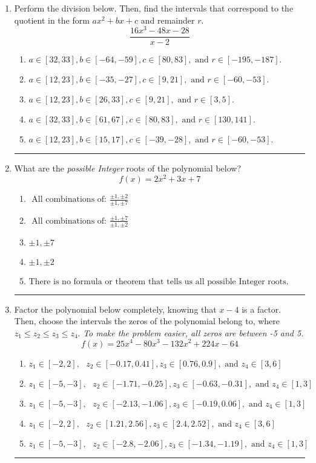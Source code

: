 \documentclass[14pt]{extbook}
\newcommand{\litem}[1]{\item#1\hspace*{-1cm}\rule{\textwidth}{0.4pt}}
\begin{document}
\begin{enumerate}
{\begin{enumerate}[label=\Alph*.]
\end{enumerate} }
\litem{
Perform the division below. Then, find the intervals that correspond to the quotient in the form $ax^2+bx+c$ and remainder $r$.\[ \frac{16x^{3} -48 x -28}{x -2} \]\begin{enumerate}[label=\Alph*.]
\item \( a \in [32, 33], b \in [-64, -59], c \in [80, 83], \text{ and } r \in [-195, -187]. \)
\item \( a \in [12, 23], b \in [-35, -27], c \in [9, 21], \text{ and } r \in [-60, -53]. \)
\item \( a \in [12, 23], b \in [26, 33], c \in [9, 21], \text{ and } r \in [3, 5]. \)
\item \( a \in [32, 33], b \in [61, 67], c \in [80, 83], \text{ and } r \in [130, 141]. \)
\item \( a \in [12, 23], b \in [15, 17], c \in [-39, -28], \text{ and } r \in [-60, -53]. \)

\end{enumerate} }
\litem{
What are the \textit{possible Integer} roots of the polynomial below?\[ f(x) = 2x^{2} +3 x + 7 \]\begin{enumerate}[label=\Alph*.]
\item \( \text{ All combinations of: }\frac{\pm 1,\pm 2}{\pm 1,\pm 7} \)
\item \( \text{ All combinations of: }\frac{\pm 1,\pm 7}{\pm 1,\pm 2} \)
\item \( \pm 1,\pm 7 \)
\item \( \pm 1,\pm 2 \)
\item \( \text{There is no formula or theorem that tells us all possible Integer roots.} \)

\end{enumerate} }
\litem{
Factor the polynomial below completely, knowing that $x -4$ is a factor. Then, choose the intervals the zeros of the polynomial belong to, where $z_1 \leq z_2 \leq z_3 \leq z_4$. \textit{To make the problem easier, all zeros are between -5 and 5.}\[ f(x) = 25x^{4} -80 x^{3} -132 x^{2} +224 x -64 \]\begin{enumerate}[label=\Alph*.]
\item \( z_1 \in [-2, 2], \text{   }  z_2 \in [-0.17, 0.41], z_3 \in [0.76, 0.9], \text{   and   } z_4 \in [3, 6] \)
\item \( z_1 \in [-5, -3], \text{   }  z_2 \in [-1.71, -0.25], z_3 \in [-0.63, -0.31], \text{   and   } z_4 \in [1, 3] \)
\item \( z_1 \in [-5, -3], \text{   }  z_2 \in [-2.13, -1.06], z_3 \in [-0.19, 0.06], \text{   and   } z_4 \in [1, 3] \)
\item \( z_1 \in [-2, 2], \text{   }  z_2 \in [1.21, 2.56], z_3 \in [2.4, 2.52], \text{   and   } z_4 \in [3, 6] \)
\item \( z_1 \in [-5, -3], \text{   }  z_2 \in [-2.8, -2.06], z_3 \in [-1.34, -1.19], \text{   and   } z_4 \in [1, 3] \)


\end{enumerate}}
\end{enumerate}
\end{document}
